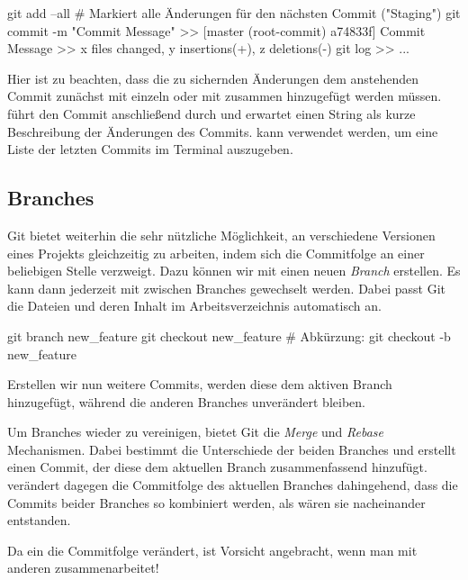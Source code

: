 \documentclass[parskip=half, final]{scrreprt}
\begin{document}
\begin{shcode}
git add --all # Markiert alle Änderungen für den nächsten Commit ("Staging")
git commit -m "Commit Message"
>> [master (root-commit) a74833f] Commit Message
>>  x files changed, y insertions(+), z deletions(-)
git log
>> ...
\end{shcode}

Hier ist zu beachten, dass die zu sichernden Änderungen dem anstehenden Commit zunächst mit  einzeln oder mit  zusammen hinzugefügt werden müssen.  führt den Commit anschließend durch und erwartet einen String als kurze Beschreibung der Änderungen des Commits.  kann verwendet werden, um eine Liste der letzten Commits im Terminal auszugeben.


\subsection{Branches}

Git bietet weiterhin die sehr nützliche Möglichkeit, an verschiedene Versionen eines Projekts gleichzeitig zu arbeiten, indem sich die Commitfolge an einer beliebigen Stelle verzweigt. Dazu können wir mit  einen neuen \emph{Branch} erstellen. Es kann dann jederzeit mit  zwischen Branches gewechselt werden. Dabei passt Git die Dateien und deren Inhalt im Arbeitsverzeichnis automatisch an.

\begin{shcode}
git branch new_feature
git checkout new_feature
# Abkürzung:
git checkout -b new_feature
\end{shcode}

Erstellen wir nun weitere Commits, werden diese dem aktiven Branch hinzugefügt, während die anderen Branches unverändert bleiben. 

Um Branches wieder zu vereinigen, bietet Git die \emph{Merge} und \emph{Rebase} Mechanismen. Dabei bestimmt  die Unterschiede der beiden Branches und erstellt einen Commit, der diese dem aktuellen Branch zusammenfassend hinzufügt.  verändert dagegen die Commitfolge des aktuellen Branches dahingehend, dass die Commits beider Branches so kombiniert werden, als wären sie nacheinander entstanden.

 Da ein  die Commitfolge verändert, ist Vorsicht angebracht, wenn man mit anderen zusammenarbeitet!
\end{document}
